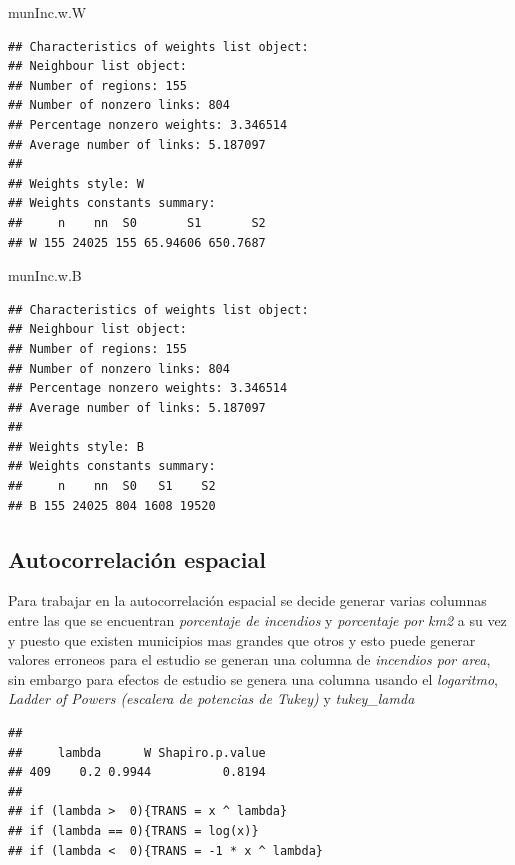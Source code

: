 \documentclass[11pt,]{article}
\newenvironment{Shaded}{\begin{snugshade}}{\end{snugshade}}
\newcommand{\NormalTok}[1]{#1}
\begin{document}
\begin{Shaded}
\begin{Highlighting}[]
\NormalTok{munInc.w.W }
\end{Highlighting}
\end{Shaded}

\begin{verbatim}
## Characteristics of weights list object:
## Neighbour list object:
## Number of regions: 155 
## Number of nonzero links: 804 
## Percentage nonzero weights: 3.346514 
## Average number of links: 5.187097 
## 
## Weights style: W 
## Weights constants summary:
##     n    nn  S0       S1       S2
## W 155 24025 155 65.94606 650.7687
\end{verbatim}

\begin{Shaded}
\begin{Highlighting}[]
\NormalTok{munInc.w.B}
\end{Highlighting}
\end{Shaded}

\begin{verbatim}
## Characteristics of weights list object:
## Neighbour list object:
## Number of regions: 155 
## Number of nonzero links: 804 
## Percentage nonzero weights: 3.346514 
## Average number of links: 5.187097 
## 
## Weights style: B 
## Weights constants summary:
##     n    nn  S0   S1    S2
## B 155 24025 804 1608 19520
\end{verbatim}

\subsection{Autocorrelación espacial}\label{autocorrelaciuxf3n-espacial}

Para trabajar en la autocorrelación espacial se decide generar varias
columnas entre las que se encuentran \emph{porcentaje de incendios} y
\emph{porcentaje por km2} a su vez y puesto que existen municipios mas
grandes que otros y esto puede generar valores erroneos para el estudio
se generan una columna de \emph{incendios por area}, sin embargo para
efectos de estudio se genera una columna usando el \emph{logaritmo},
\emph{Ladder of Powers (escalera de potencias de Tukey)} y
\emph{tukey\_lamda}

\begin{verbatim}
## 
##     lambda      W Shapiro.p.value
## 409    0.2 0.9944          0.8194
## 
## if (lambda >  0){TRANS = x ^ lambda} 
## if (lambda == 0){TRANS = log(x)} 
## if (lambda <  0){TRANS = -1 * x ^ lambda}
\end{verbatim}
\end{document}
